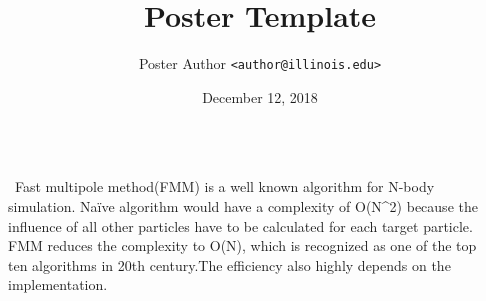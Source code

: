 \documentclass[final,t]{beamer}
\title{Poster Template}
\author{Poster Author \texttt{<author@illinois.edu>}}
\institute{%
  Computer Science
  $\cdot$ University of Illinois
}
\date{December 12, 2018}
\begin{document}
\begin{frame}[fragile]{}
  \begin{columns}[t]


    \begin{column}{.45\linewidth}
      \begin{tcolorbox}[toplevelbox,adjusted title={Problem Statement}]
        \ Fast multipole method(FMM) is a well known algorithm for N-body simulation. Naïve algorithm would have a complexity of O(N^2) because the influence of all other particles have to be calculated for each target particle. FMM reduces the complexity to O(N), which is recognized as one of the top ten algorithms in 20th century.The efficiency also highly depends on the implementation. 

      \end{tcolorbox}

      \begin{tcolorbox}[toplevelbox,adjusted title=Approach]
        \lipsum[2-3]
      \end{tcolorbox}

      \begin{tcolorbox}[toplevelbox,adjusted title=Tech Detail 1]
        \lipsum[4]
      \end{tcolorbox}

    \end{column}



    \begin{column}{.45\linewidth}
      \begin{tcolorbox}[toplevelbox,adjusted title=Tech Detail 2]
        \lipsum[5]
      \end{tcolorbox}

      \begin{tcolorbox}[toplevelbox,adjusted title=Results]
        \lipsum[6-7]
      \end{tcolorbox}

      \begin{tcolorbox}[toplevelbox,adjusted title=References]
        \lipsum[8]
      \end{tcolorbox}

    \end{column}


  \end{columns}
\end{frame}
\end{document}
